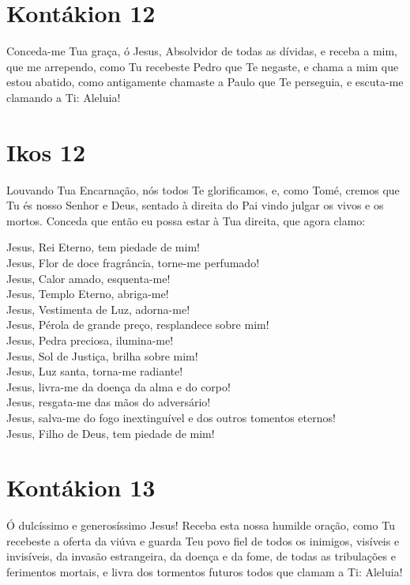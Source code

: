 \documentclass{subfiles}
\begin{document}
\section{Kontákion 12}

Conceda-me Tua graça, ó Jesus, Absolvidor de todas as dívidas, e
receba a mim, que me arrependo, como Tu recebeste Pedro que Te negaste, e
chama a mim que estou abatido, como antigamente chamaste a Paulo que Te
perseguia, e escuta-me clamando a Ti: Aleluia!

\section{Ikos 12}

Louvando Tua Encarnação, nós todos Te glorificamos, e, como Tomé,
cremos que Tu és nosso Senhor e Deus, sentado à direita do Pai vindo julgar
os vivos e os mortos. Conceda que então eu possa estar à Tua direita, que
agora clamo:

Jesus, Rei Eterno, tem piedade de mim! \\
Jesus, Flor de doce fragrância, torne-me perfumado! \\
Jesus, Calor amado, esquenta-me! \\
Jesus, Templo Eterno, abriga-me! \\
Jesus, Vestimenta de Luz, adorna-me! \\
Jesus, Pérola de grande preço, resplandece sobre mim! \\
Jesus, Pedra preciosa, ilumina-me! \\
Jesus, Sol de Justiça, brilha sobre mim! \\
Jesus, Luz santa, torna-me radiante! \\
Jesus, livra-me da doença da alma e do corpo! \\
Jesus, resgata-me das mãos do adversário! \\
Jesus, salva-me do fogo inextinguível e dos outros tomentos eternos! \\
Jesus, Filho de Deus, tem piedade de mim!

\section{Kontákion 13}

Ó dulcíssimo e generosíssimo Jesus! Receba esta nossa humilde
oração, como Tu recebeste a oferta da viúva e guarda Teu povo fiel de todos
os inimigos, visíveis e invisíveis, da invasão estrangeira, da doença e da fome,
de todas as tribulações e ferimentos mortais, e livra dos tormentos futuros
todos que clamam a Ti: Aleluia! 
\end{document}
